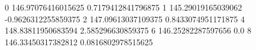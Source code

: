 0 146.97076416015625 0.7179412841796875
1 145.29019165039062 -0.9626312255859375
2 147.09613037109375 0.8433074951171875
4 148.83811950683594 2.585296630859375
6 146.25282287597656 0.0
8 146.33450317382812 0.0816802978515625
